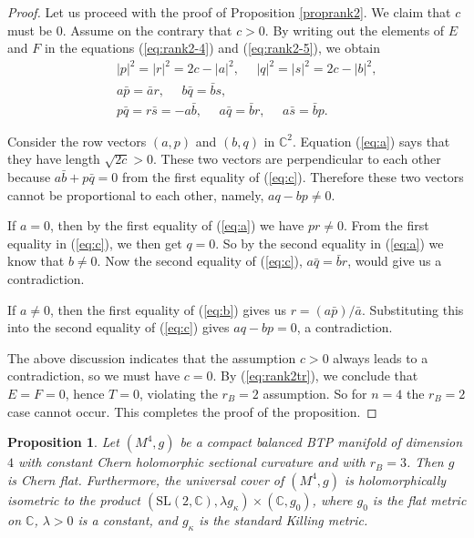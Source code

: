 \documentclass{amsart}
\newtheorem{proposition}{Proposition}
\begin{document}
\begin{proof}
Let us proceed with the proof of Proposition \ref{proprank2}. We claim that $c$ must be $0$. Assume on the contrary that $c>0$. By writing out the elements of $E$ and $F$ in the equations (\ref{eq:rank2-4}) and (\ref{eq:rank2-5}), we obtain
\begin{eqnarray}
 && |p|^2=|r|^2 = 2c - |a|^2, \ \ \ \ \ \ |q|^2=|s|^2 = 2c-|b|^2, \label{eq:a}\\
 && a \bar{p} = \bar{a}r, \ \ \ \ \ \ b\bar{q} = \bar{b}s, \label{eq:b} \\
 && p\bar{q} = r\bar{s} = -a\bar{b}, \ \ \ \ \ \ a\bar{q}=\bar{b}r, \ \ \ \ \ \ a\bar{s}=\bar{b}p.   \label{eq:c}
\end{eqnarray}

Consider the row vectors $(a,p)$ and $(b,q)$ in ${\mathbb C}^2$. Equation (\ref{eq:a}) says that they have length $\sqrt{2c}>0$. These two vectors are perpendicular to each other because $a\bar{b}+p\bar{q}=0$ from the first equality of (\ref{eq:c}). Therefore these two vectors cannot be proportional to each other, namely, $aq-bp\neq 0$.

If $a=0$, then by the first equality of (\ref{eq:a}) we have $pr\neq 0$. From the first equality in (\ref{eq:c}), we then get $q=0$.  So by the second equality in (\ref{eq:a}) we know that $b\neq 0$. Now the  second equality of (\ref{eq:c}), $a\bar{q}=\bar{b}r$, would give us a contradiction.

If $a\neq 0$, then the first equality of (\ref{eq:b}) gives us $r=(a\bar{p})/\bar{a}$. Substituting this into the second equality of (\ref{eq:c}) gives $aq-bp=0$, a contradiction.

The above discussion indicates that the assumption $c>0$ always leads to a contradiction, so we must have $c=0$. By (\ref{eq:rank2tr}), we conclude that  $E=F=0$, hence $T=0$, violating the $r_B=2$ assumption. So for $n=4$ the $r_B=2$ case cannot occur. This completes the proof of the proposition.
\end{proof}

\begin{proposition} \label{proprank3}
Let $(M^4,g)$ be a compact balanced BTP manifold of dimension $4$ with constant Chern holomorphic sectional curvature and with $r_B= 3$. Then $g$ is Chern flat. Furthermore, the universal cover of $(M^4,g)$ is holomorphically isometric to the product $(\mbox{SL}(2,{\mathbb C}), \lambda g_{\kappa}) \times ({\mathbb C},g_0)$, where $g_0$ is the flat metric on ${\mathbb C}$, $\lambda >0$ is a constant, and $g_{\kappa}$ is the standard Killing metric.
\end{proposition}
\end{document}
